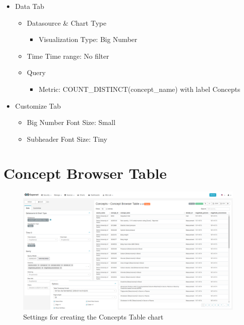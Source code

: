 \documentclass[
]{book}
\providecommand{\tightlist}{%
  \setlength{\itemsep}{0pt}\setlength{\parskip}{0pt}}
\begin{document}
\begin{itemize}
\tightlist
\item
  Data Tab

  \begin{itemize}
  \tightlist
  \item
    Datasource \& Chart Type

    \begin{itemize}
    \tightlist
    \item
      Visualization Type: Big Number
    \end{itemize}
  \item
    Time
    Time range: No filter
  \item
    Query

    \begin{itemize}
    \tightlist
    \item
      Metric: COUNT\_DISTINCT(concept\_name) with label Concepts
    \end{itemize}
  \end{itemize}
\item
  Customize Tab

  \begin{itemize}
  \tightlist
  \item
    Big Number Font Size: Small
  \item
    Subheader Font Size: Tiny
  \end{itemize}
\end{itemize}

\hypertarget{concept-browser-table}{%
\section{Concept Browser Table}\label{concept-browser-table}}

\begin{figure}
\includegraphics[width=1\linewidth]{images/08-concepts_browser/03-concepts_table} \caption{Settings for creating the Concepts Table chart}\label{fig:conceptsTable}
\end{figure}
\end{document}

